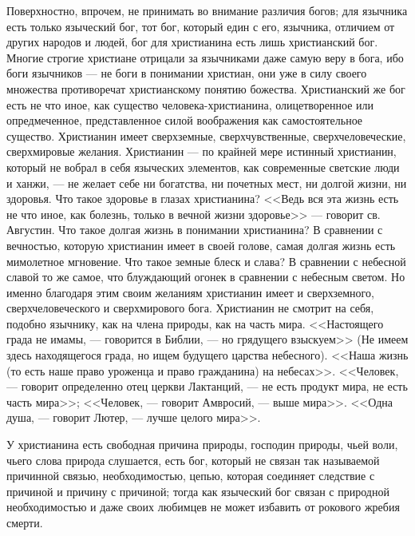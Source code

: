 \documentclass[12pt]{article}
\begin{document}
Поверхностно, впрочем, не принимать во внимание различия богов; для язычника есть только языческий бог, тот бог, который един с его, язычника, отличием от других народов и людей, бог для христианина есть лишь христианский бог. Многие строгие христиане отрицали за язычниками даже самую веру в бога, ибо боги язычников --- не боги в понимании христиан, они уже в силу своего множества противоречат христианскому понятию божества. Христианский же бог есть не что иное, как существо человека-христианина, олицетворенное или опредмеченное, представленное силой воображения как самостоятельное существо. Христианин имеет сверхземные, сверхчувственные, сверхчеловеческие, сверхмировые желания. Христианин --- по крайней мере истинный христианин, который не вобрал в себя языческих элементов, как современные светские люди и ханжи, --- не желает себе ни богатства, ни почетных мест, ни долгой жизни, ни здоровья. Что такое здоровье в глазах христианина? <<Ведь вся эта жизнь есть не что иное, как болезнь, только в вечной жизни здоровье>>  --- говорит св. Августин. Что такое долгая жизнь в понимании христианина? В сравнении с вечностью, которую христианин имеет в своей голове, самая долгая жизнь есть мимолетное мгновение. Что такое земные блеск и слава? В сравнении с небесной славой то же самое, что блуждающий огонек в сравнении с небесным светом. Но именно благодаря этим своим желаниям христианин имеет и сверхземного, сверхчеловеческого и сверхмирового бога. Христианин не смотрит на себя, подобно язычнику, как на члена природы, как на часть мира. <<Настоящего града не имамы, --- говорится в Библии, --- но грядущего взыскуем>> (Не имеем здесь находящегося града, но ищем будущего царства небесного). <<Наша жизнь (то есть наше право уроженца и право гражданина) на небесах>>. <<Человек, --- говорит определенно отец церкви Лактанций, --- не есть продукт мира, не есть часть мира>>; <<Человек, --- говорит Амвросий, --- выше мира>>. <<Одна душа, --- говорит Лютер, --- лучше целого мира>>. 

У христианина есть свободная причина природы, господин природы, чьей воли, чьего слова природа слушается, есть бог, который не связан так называемой причинной связью, необходимостью, цепью, которая соединяет следствие с причиной и причину с причиной; тогда как языческий бог связан с природной необходимостью и даже своих любимцев не может избавить от рокового жребия смерти. 
\end{document}
